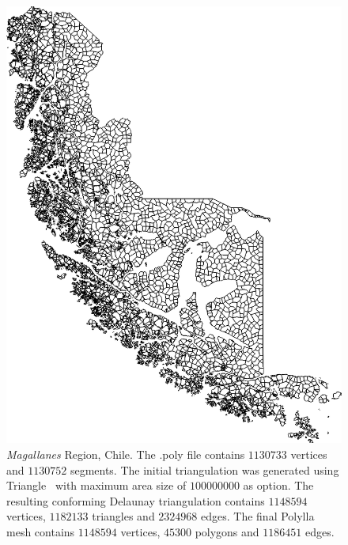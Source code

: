 \documentclass[lineno,pdflatex,sn-mathphys]{sn-jnl}%
\theoremstyle{thmstyleone}%
\theoremstyle{thmstyletwo}%
\theoremstyle{thmstylethree}%
\begin{document}
\begin{appendices}
\begin{figure}[]
    \centering
    \includegraphics[width=\textwidth]{magallanesDpa100000000gzn.png}
    \caption{{\em Magallanes} Region, Chile. The .poly file contains $1130733$ vertices and $1130752$ segments. The initial triangulation was generated using Triangle~\cite{triangle2d} with maximum area size of $100000000$ as option. The resulting conforming Delaunay triangulation contains $1148594$ vertices, $1182133$ triangles and $2324968$ edges. The final Polylla mesh contains $1148594$ vertices,  $45300$ polygons and $1186451$ edges.}
    \label{fig:magallanes}
\end{figure}


\end{appendices}
\end{document}
